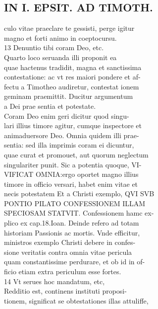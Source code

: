 \documentclass{article}
\begin{document}
\begin{pages}
\section*{IN I. EPSIT. AD TIMOTH. \\
                }
culo vitae praeclare te gessisti, perge igitur \\
                magno et forti animo in coeptocursu. \\
                13 Denuntio tibi coram Deo, etc. \\
                Quarto loco seruanda illi proponit ea \\
                quae hactenus tradidit, magna et sanctissima \\
                contestatione: ac vt res maiori pondere et af- \\
                fectu a Timotheo audiretur, contestat ionem \\
                geminam praemittit. Ducitur argumentum \\
                a Dei prae sentia et potestate. \\
                Coram Deo enim geri dicitur quod singu- \\
                lari illius timore agitur, cumque inspectore et \\
                animaduersore Deo. Omnia quidem illi prae- \\
                sentia: sed illa imprimis coram ei dicuntur, \\
                quae curat et promouet, aut quorum neglectum \\
                singulariter punit. Sic a potentia quoque, VI- \\
                VIFICAT OMNIA:ergo oportet magno illius \\
                timore in officio versari, habet enim vitae et \\
                necis potestatem Et a Christi exemplo, QVI SVB \\
                PONTIO PILATO CONFESSIONEM ILLAM \\
                SPECIOSAM STATVIT. Confessionem hamc ex- \\
                plico ex cap.18.Ioan. Deinde refero ad totam \\
                historiam Passionis ac mortis. Vnde efficitur, \\
                ministros exemplo Christi debere in confes- \\
                sione veritatis contra omnia vitae pericula \\
                quam constantissime perdurare, et ob id in of- \\
                ficio etiam extra periculum esse fortes. \\
                14 Vt serues hoc mandatum, etc, \\
                Redditio est, continens instituti proposi- \\
                tionem, significat se obtestationes illas attuliffe, \\
                

\end{pages}
\end{document}
